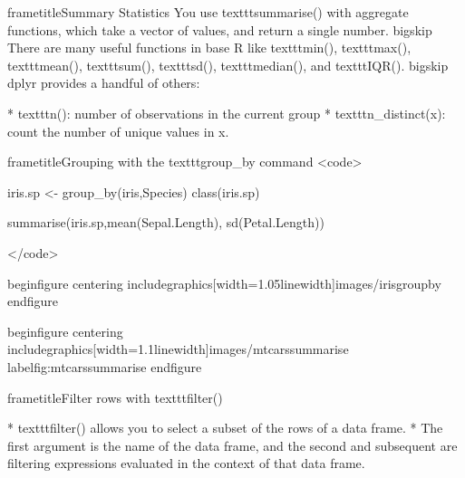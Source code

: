 		frametitle{Summary Statistics}
		You use texttt{summarise()} with aggregate functions, which take a vector of values, and return a single number. bigskip There are many useful functions in base R like texttt{min()}, texttt{max()}, texttt{mean()}, texttt{sum()}, texttt{sd()}, texttt{median()}, and texttt{IQR()}. bigskip dplyr provides a handful of others:
		
			         * 
			texttt{n()}: number of observations in the current group
			         * 
			texttt{n_distinct(x)}: count the number of unique values in x.
		
		
	
	
		frametitle{Grouping with the texttt{group_by} command}
		<code>
		
		iris.sp <- group_by(iris,Species)
		class(iris.sp)
		
		summarise(iris.sp,mean(Sepal.Length), sd(Petal.Length))
		
		</code>
	
	
		begin{figure}
			centering
			includegraphics[width=1.05linewidth]{images/irisgroupby}
		end{figure}
		
	
	
		begin{figure}
			centering
			includegraphics[width=1.1linewidth]{images/mtcarssummarise}
			label{fig:mtcarssummarise}
		end{figure}
	
	
	
	
		frametitle{Filter rows with texttt{filter()}}
		
			         * texttt{filter()} allows you to select a subset of the rows of a data frame. 
			         * The first argument is the name of the data frame, and the second and subsequent are filtering expressions evaluated in the context of that data frame.
		
		
		
		
	
		
